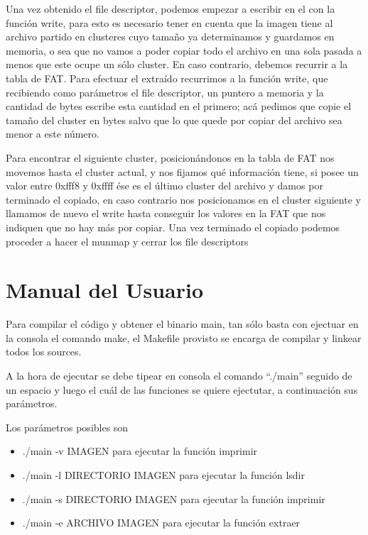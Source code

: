 \documentclass[a4paper,10pt]{article}
\begin{document}
Una vez obtenido el file descriptor, podemos empezar a escribir en el con la función write, para esto es necesario tener en cuenta que la imagen tiene al archivo partido en clusteres cuyo tamaño ya determinamos y guardamos en memoria, o sea que no vamos a poder copiar todo el archivo en una sola pasada a menos que este ocupe un sólo cluster. En caso contrario, debemos recurrir a la tabla de FAT. Para efectuar el extraído recurrimos a la función write, que recibiendo como parámetros el file descriptor, un puntero a memoria y la cantidad de bytes escribe esta cantidad en el primero; acá pedimos que copie el tamaño del cluster en bytes salvo que lo que quede por copiar del archivo sea menor a este número.
 
Para encontrar el siguiente cluster, posicionándonos en la tabla de FAT nos movemos hasta el cluster actual, y nos fijamos qué información tiene, si posee un valor entre 0xfff8 y 0xffff ése es el último cluster del archivo y damos por terminado el copiado, en caso contrario nos posicionamos en el cluster siguiente y llamamos de nuevo el write hasta conseguir los valores en la FAT que nos indiquen que no hay más por copiar. Una vez terminado el copiado podemos proceder a hacer el munmap y cerrar los file descriptors

\section{Manual del Usuario}

Para compilar el código y obtener el binario main, tan sólo basta con ejectuar en la consola el comando make, el Makefile provisto se encarga de compilar y linkear todos los sources. 

A la hora de ejecutar se debe tipear en consola el comando “./main” seguido de un espacio y luego el cuál de las funciones se quiere ejectutar, a continuación sus parámetros.

Los parámetros posibles son

\begin{itemize}
 \item ./main -v IMAGEN para ejecutar la función imprimir
 \item ./main -l DIRECTORIO IMAGEN para ejecutar la función lsdir
 \item ./main -s DIRECTORIO IMAGEN para ejecutar la función imprimir
 \item ./main -e ARCHIVO IMAGEN para ejecutar la función extraer
  
\end{itemize}
\end{document}
